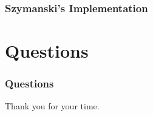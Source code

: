 \documentclass[t, pdftex]{beamer}
\begin{document}
\begin{frame}
  \frametitle{Szymanski's Implementation}
  \begin{multicols*}{3}
    
  \end{multicols*}
\end{frame}


\section{Questions}
\begin{frame}[c]
    \frametitle{Questions}  %
    Thank you for your time.
\end{frame}


\end{document}
